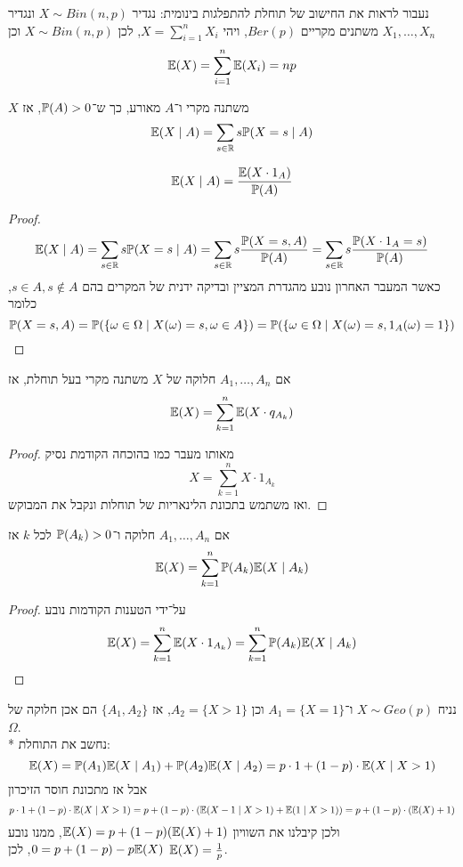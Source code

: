 \begin{example}
	נעבור לראות את החישוב של תוחלת להתפלגות בינומית:
	נגדיר $X \sim Bin(n, p)$ ונגדיר $X_1, \dots, X_n$ משתנים מקריים $Ber(p)$, ויהי $X = \sum_{i = 1}^n X_i$, לכן $X \sim Bin(n, p)$ וכן
	\[
		\mathbb{E}(X) = \sum_{i = 1}^n \mathbb{E}(X_i) = np
	\]
\end{example}
\begin{definition}
	$X$ משתנה מקרי ו־$A$ מאורע, כך ש־$\mathbb{P}(A) > 0$, אז
	\[ 
		\mathbb{E}(X \mid A)
		= \sum_{s \in \mathbb{R}} s \mathbb{P}(X = s \mid A)
	\]
\end{definition}
\begin{proposition}
	\[
		\mathbb{E}(X \mid A) = \frac{\mathbb{E}(X \cdot 1_A)}{\mathbb{P}(A)}
	\]
\end{proposition}
\begin{proof}
	\[
		\mathbb{E}(X \mid A)
		= \sum_{s \in \mathbb{R}} s \mathbb{P}(X = s \mid A)
		= \sum_{s \in \mathbb{R}} s \frac{\mathbb{P}(X = s, A)}{\mathbb{P}(A)}
		= \sum_{s \in \mathbb{R}} s \frac{\mathbb{P}(X \cdot 1_A = s)}{\mathbb{P}(A)}
	\]
	כאשר המעבר האחרון נובע מהגדרת המציין ובדיקה ידנית של המקרים בהם $s \in A, s \notin A$, כלומר
	\[
		\mathbb{P}(X = s, A)
		= \mathbb{P}(\{\omega \in \Omega \mid X(\omega) = s, \omega \in A\})
		= \mathbb{P}(\{\omega \in \Omega \mid X(\omega) = s, 1_A(\omega) = 1\})
	\]
\end{proof}
\begin{proposition}
	אם $A_1, \dots, A_n$ חלוקה של $X$ משתנה מקרי בעל תוחלת, אז
	\[
		\mathbb{E}(X) = \sum_{k = 1}^n \mathbb{E}(X \cdot q_{A_k})
	\]
\end{proposition}
\begin{proof}
	מאותו מעבר כמו בהוכחה הקודמת נסיק
	\[
		X = \sum_{k = 1}^n X \cdot 1_{A_k}
	\]
	ואז משתמש בתכונת הלינאריות של תוחלות ונקבל את המבוקש.
\end{proof}
\begin{proposition}
	אם $A_1, \dots, A_n$ חלוקה ו־$\mathbb{P}(A_k) > 0$ לכל $k$ אז
	\[
		\mathbb{E}(X) = \sum_{k = 1}^n \mathbb{P}(A_k) \mathbb{E}(X \mid A_k)
	\]
\end{proposition}
\begin{proof}
	על־ידי הטענות הקודמות נובע
	\[
		\mathbb{E}(X)
		= \sum_{k = 1}^n \mathbb{E}(X \cdot 1_{A_k})
		= \sum_{k = 1}^n \mathbb{P}(A_k) \mathbb{E}(X \mid A_k)
	\]
\end{proof}
\begin{example}
	נניח $X \sim Geo(p)$ ו־$A_1 = \{X = 1\}$ וכן $A_2 = \{X > 1\}$, אז $\{A_1, A_2\}$ הם אכן חלוקה של $\Omega$. \\*
	נחשב את התוחלת:
	\[
		\mathbb{E}(X)
		= \mathbb{P}(A_1) \mathbb{E}(X \mid A_1) + \mathbb{P}(A_2) \mathbb{E}(X \mid A_2)
		= p \cdot 1 + (1 - p) \cdot \mathbb{E}(X \mid X > 1)
	\]
	אבל אז מתכונת חוסר הזיכרון
	\[
		p \cdot 1 + (1 - p) \cdot \mathbb{E}(X \mid X > 1)
		= p + (1 - p) \cdot (\mathbb{E}(X - 1 \mid X > 1) + \mathbb{E}(1 \mid X > 1))
		= p + (1 - p) \cdot (\mathbb{E}(X) + 1)
	\]
	ולכן קיבלנו את השוויון $\mathbb{E}(X) = p + (1 - p)(\mathbb{E}(X) + 1)$, ממנו נובע $0 = p + (1 - p) - p \mathbb{E}(X)$, לכן $\mathbb{E}(X) = \frac{1}{p}$.
\end{example}

